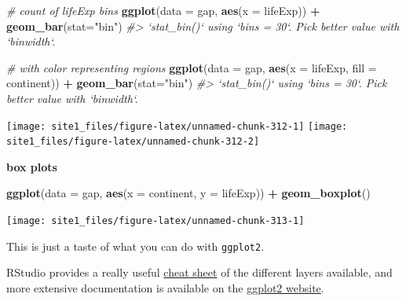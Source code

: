 \documentclass[]{book}
\newenvironment{Shaded}{\begin{snugshade}}{\end{snugshade}}
\newcommand{\KeywordTok}[1]{\textcolor[rgb]{0.13,0.29,0.53}{\textbf{#1}}}
\newcommand{\DataTypeTok}[1]{\textcolor[rgb]{0.13,0.29,0.53}{#1}}
\newcommand{\StringTok}[1]{\textcolor[rgb]{0.31,0.60,0.02}{#1}}
\newcommand{\CommentTok}[1]{\textcolor[rgb]{0.56,0.35,0.01}{\textit{#1}}}
\newcommand{\OperatorTok}[1]{\textcolor[rgb]{0.81,0.36,0.00}{\textbf{#1}}}
\newcommand{\NormalTok}[1]{#1}
\begin{document}
\begin{Shaded}
\begin{Highlighting}[]
\CommentTok{# count of lifeExp bins}
\KeywordTok{ggplot}\NormalTok{(}\DataTypeTok{data =}\NormalTok{ gap, }\KeywordTok{aes}\NormalTok{(}\DataTypeTok{x =}\NormalTok{ lifeExp)) }\OperatorTok{+}\StringTok{ }
\StringTok{  }\KeywordTok{geom_bar}\NormalTok{(}\DataTypeTok{stat=}\StringTok{"bin"}\NormalTok{)}
\CommentTok{#> `stat_bin()` using `bins = 30`. Pick better value with `binwidth`.}

\CommentTok{# with color representing regions}
\KeywordTok{ggplot}\NormalTok{(}\DataTypeTok{data =}\NormalTok{ gap, }\KeywordTok{aes}\NormalTok{(}\DataTypeTok{x =}\NormalTok{ lifeExp, }\DataTypeTok{fill =}\NormalTok{ continent)) }\OperatorTok{+}\StringTok{ }
\StringTok{  }\KeywordTok{geom_bar}\NormalTok{(}\DataTypeTok{stat=}\StringTok{"bin"}\NormalTok{)}
\CommentTok{#> `stat_bin()` using `bins = 30`. Pick better value with `binwidth`.}
\end{Highlighting}
\end{Shaded}

\begin{center}\texttt{[image: site1\_files/figure-latex/unnamed-chunk-312-1]} \texttt{[image: site1\_files/figure-latex/unnamed-chunk-312-2]} \end{center}

\textbf{box plots}

\begin{Shaded}
\begin{Highlighting}[]
\KeywordTok{ggplot}\NormalTok{(}\DataTypeTok{data =}\NormalTok{ gap, }\KeywordTok{aes}\NormalTok{(}\DataTypeTok{x =}\NormalTok{ continent, }\DataTypeTok{y =}\NormalTok{ lifeExp)) }\OperatorTok{+}\StringTok{ }
\StringTok{  }\KeywordTok{geom_boxplot}\NormalTok{()}
\end{Highlighting}
\end{Shaded}

\begin{center}\texttt{[image: site1\_files/figure-latex/unnamed-chunk-313-1]} \end{center}

This is just a taste of what you can do with \texttt{ggplot2}.

RStudio provides a really useful
\href{https://www.rstudio.com/wp-content/uploads/2015/03/ggplot2-cheatsheet.pdf}{cheat
sheet} of the different layers available, and more extensive
documentation is available on the
\href{http://docs.ggplot2.org/current/}{ggplot2 website}.
\end{document}
